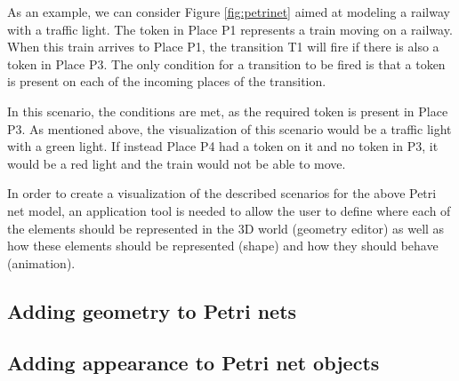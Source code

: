 As an example, we can consider Figure \ref{fig:petrinet} aimed at modeling a railway with a traffic light. The token in Place P1 represents a train moving on a railway. When this train arrives to Place P1, the transition T1 will fire if there is also a token in Place P3. The only condition for a transition to be fired is that a token is present on each of the incoming places of the transition.

In this scenario, the conditions are met, as the required token is present in Place P3. As mentioned above, the visualization of this scenario would be a traffic light with a green light. If instead Place P4 had a token on it and no token in P3, it would be a red light and the train would not be able to move. 


In order to create a visualization of the described scenarios for the above Petri net model, an application tool is needed to allow the user to define where each of the elements should be represented in the 3D world (geometry editor) as well as how these elements should be represented (shape) and how they should behave (animation). 

\subsection{Adding geometry to Petri nets}



\subsection{Adding appearance to Petri net objects}
\label{sec:appearance}

